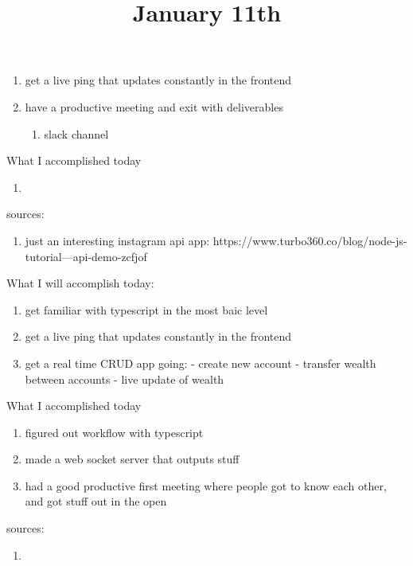 \begin{enumerate}
	\item get a live ping that updates constantly in the frontend
	\item have a productive meeting and exit with deliverables
		\begin{enumerate}
			\item slack channel
		\end{enumerate}
\end{enumerate}

What I accomplished today

\begin{enumerate}
	\item 
\end{enumerate}

sources:

\begin{enumerate}
	\item just an interesting instagram api app: https://www.turbo360.co/blog/node-js-tutorial---api-demo-zcfjof
\end{enumerate}

\title{January 11th}

What I will accomplish today:

\begin{enumerate}
	\item get familiar with typescript in the most baic level
	\item get a live ping that updates constantly in the frontend
	\item get a real time CRUD app going:
		- create new account
		- transfer wealth between accounts
		- live update of wealth
\end{enumerate}

What I accomplished today

\begin{enumerate}
	\item figured out workflow with typescript
	\item made a web socket server that outputs stuff 
	\item had a good productive first meeting where people got to know each other, and got stuff out in the open
\end{enumerate}

sources:

\begin{enumerate}
	\item 
\end{enumerate}

